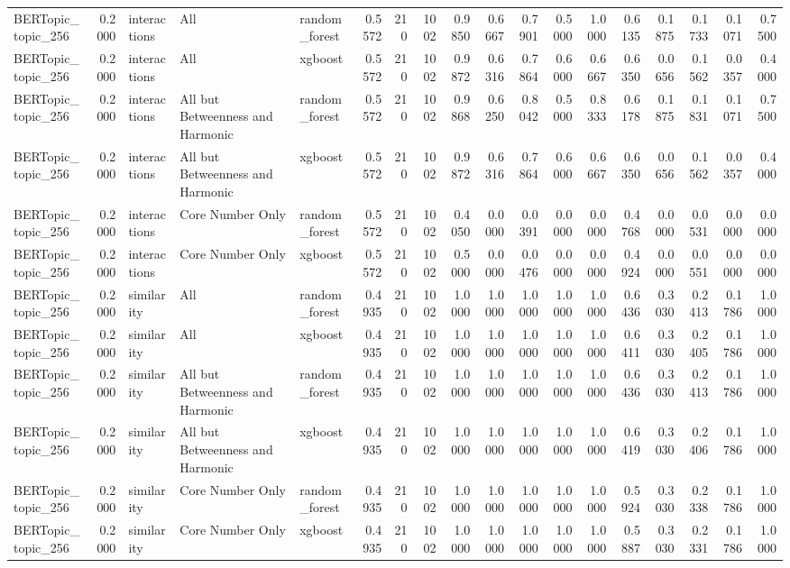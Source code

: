 \begin{tabular}{lrlllrrrrrrrrrrrrr}
BERTopic_topic_256 & 0.2000 & interactions & All & random_forest & 0.5572 & 210 & 1002 & 0.9850 & 0.6667 & 0.7901 & 0.5000 & 1.0000 & 0.6135 & 0.1875 & 0.1733 & 0.1071 & 0.7500 \\
BERTopic_topic_256 & 0.2000 & interactions & All & xgboost & 0.5572 & 210 & 1002 & 0.9872 & 0.6316 & 0.7864 & 0.6000 & 0.6667 & 0.6350 & 0.0656 & 0.1562 & 0.0357 & 0.4000 \\
BERTopic_topic_256 & 0.2000 & interactions & All but Betweenness and Harmonic & random_forest & 0.5572 & 210 & 1002 & 0.9868 & 0.6250 & 0.8042 & 0.5000 & 0.8333 & 0.6178 & 0.1875 & 0.1831 & 0.1071 & 0.7500 \\
BERTopic_topic_256 & 0.2000 & interactions & All but Betweenness and Harmonic & xgboost & 0.5572 & 210 & 1002 & 0.9872 & 0.6316 & 0.7864 & 0.6000 & 0.6667 & 0.6350 & 0.0656 & 0.1562 & 0.0357 & 0.4000 \\
BERTopic_topic_256 & 0.2000 & interactions & Core Number Only & random_forest & 0.5572 & 210 & 1002 & 0.4050 & 0.0000 & 0.0391 & 0.0000 & 0.0000 & 0.4768 & 0.0000 & 0.0531 & 0.0000 & 0.0000 \\
BERTopic_topic_256 & 0.2000 & interactions & Core Number Only & xgboost & 0.5572 & 210 & 1002 & 0.5000 & 0.0000 & 0.0476 & 0.0000 & 0.0000 & 0.4924 & 0.0000 & 0.0551 & 0.0000 & 0.0000 \\
BERTopic_topic_256 & 0.2000 & similarity & All & random_forest & 0.4935 & 210 & 1002 & 1.0000 & 1.0000 & 1.0000 & 1.0000 & 1.0000 & 0.6436 & 0.3030 & 0.2413 & 0.1786 & 1.0000 \\
BERTopic_topic_256 & 0.2000 & similarity & All & xgboost & 0.4935 & 210 & 1002 & 1.0000 & 1.0000 & 1.0000 & 1.0000 & 1.0000 & 0.6411 & 0.3030 & 0.2405 & 0.1786 & 1.0000 \\
BERTopic_topic_256 & 0.2000 & similarity & All but Betweenness and Harmonic & random_forest & 0.4935 & 210 & 1002 & 1.0000 & 1.0000 & 1.0000 & 1.0000 & 1.0000 & 0.6436 & 0.3030 & 0.2413 & 0.1786 & 1.0000 \\
BERTopic_topic_256 & 0.2000 & similarity & All but Betweenness and Harmonic & xgboost & 0.4935 & 210 & 1002 & 1.0000 & 1.0000 & 1.0000 & 1.0000 & 1.0000 & 0.6419 & 0.3030 & 0.2406 & 0.1786 & 1.0000 \\
BERTopic_topic_256 & 0.2000 & similarity & Core Number Only & random_forest & 0.4935 & 210 & 1002 & 1.0000 & 1.0000 & 1.0000 & 1.0000 & 1.0000 & 0.5924 & 0.3030 & 0.2338 & 0.1786 & 1.0000 \\
BERTopic_topic_256 & 0.2000 & similarity & Core Number Only & xgboost & 0.4935 & 210 & 1002 & 1.0000 & 1.0000 & 1.0000 & 1.0000 & 1.0000 & 0.5887 & 0.3030 & 0.2331 & 0.1786 & 1.0000 \\

\end{tabular}

